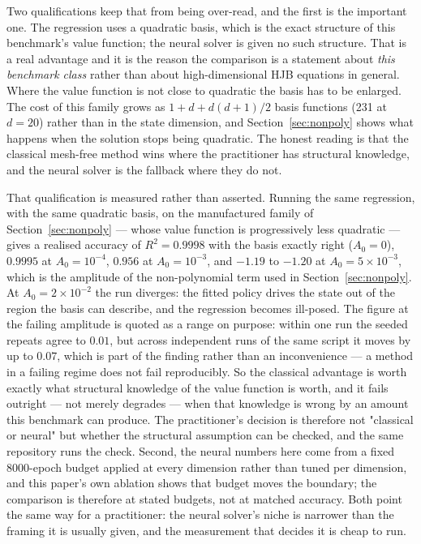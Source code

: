 \documentclass[conference]{IEEEtran}
\begin{document}
Two qualifications keep that from being over-read, and the first is the important one. The regression
uses a quadratic basis, which is the exact structure of this benchmark's value function; the neural
solver is given no such structure. That is a real advantage and it is the reason the comparison is a
statement about \emph{this benchmark class} rather than about high-dimensional HJB equations in
general. Where the value function is not close to quadratic the basis has to be enlarged. The cost of this
family grows as $1 + d + d(d+1)/2$ basis functions (231 at $d=20$) rather than in the state dimension,
and Section~\ref{sec:nonpoly} shows what happens when the solution stops being quadratic. The honest
reading is that the classical mesh-free method wins where the practitioner
has structural knowledge, and the neural solver is the fallback where they do not.

That qualification is measured rather than asserted. Running the same regression, with the same
quadratic basis, on the manufactured family of Section~\ref{sec:nonpoly} --- whose value function is
progressively less quadratic --- gives a realised accuracy of $R^2 = 0.9998$ with the basis exactly
right ($A_0 = 0$), $0.9995$ at $A_0 = 10^{-4}$, $0.956$ at $A_0 = 10^{-3}$, and $-1.19$ to $-1.20$ at
$A_0 = 5\times10^{-3}$, which is the amplitude of the non-polynomial term used in
Section~\ref{sec:nonpoly}. At $A_0 = 2\times10^{-2}$ the run diverges: the fitted policy
drives the state out of the region the basis can describe, and the regression becomes ill-posed. The
figure at the failing amplitude is quoted as a range on purpose: within one run the seeded repeats
agree to $0.01$, but across independent runs of the same script it moves by up to $0.07$, which is
part of the finding rather than an inconvenience --- a method in a failing regime does not fail
reproducibly. So
the classical advantage is worth exactly what structural knowledge of the value function is worth, and
it fails outright --- not merely degrades --- when that knowledge is wrong by an amount this benchmark
can produce. The practitioner's decision is therefore not "classical or neural" but whether the
structural assumption can be checked, and the same repository runs the check. Second, the neural
numbers here come from a fixed 8000-epoch budget applied at every dimension rather than tuned per
dimension, and this paper's own ablation shows that budget moves the boundary; the comparison is
therefore at stated budgets, not at matched accuracy. Both point the same way for a practitioner:
the neural solver's niche is narrower than the framing it is usually given, and the measurement that
decides it is cheap to run.
\end{document}
